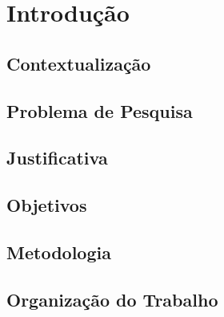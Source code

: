\chapter[Introdução]{Introdução}

\section{Contextualização}

\section{Problema de Pesquisa}

\section{Justificativa}

\section{Objetivos}

\section{Metodologia}

\section{Organização do Trabalho}

